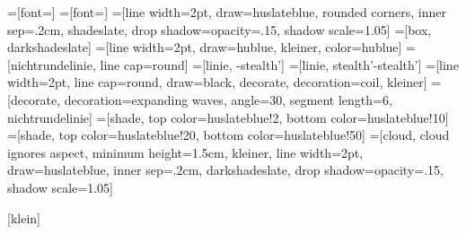 =[font={\footnotesize}]
=[font={\small}]
=[line width=2pt, draw=huslateblue, rounded corners, inner
sep=.2cm, shadeslate, drop shadow={opacity=.15}, shadow scale=1.05]
=[box, darkshadeslate]
=[line width=2pt, draw=hublue, kleiner, color=hublue]
=[nichtrundelinie, line cap=round]
=[linie, -stealth']
=[linie, stealth'-stealth']
=[line width=2pt, line cap=round, draw=black, decorate,
decoration=coil, kleiner]
=[decorate, decoration={expanding waves, angle=30, segment
length=6}, nichtrundelinie]
=[shade, top color=huslateblue!2, bottom color=huslateblue!10]
=[shade, top color=huslateblue!20, bottom
color=huslateblue!50]
=[cloud, cloud ignores aspect, minimum height=1.5cm, kleiner,
line width=2pt, draw=huslateblue, inner sep=.2cm, darkshadeslate,
drop shadow={opacity=.15}, shadow scale=1.05]

[klein]

